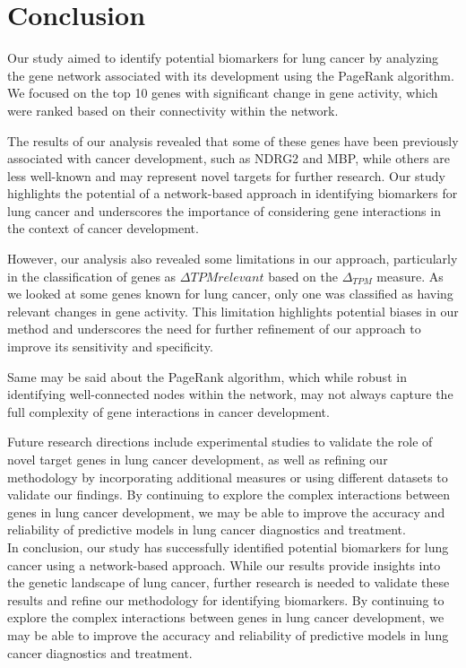 \section{Conclusion} \label{sec:conclusion}
Our study aimed to identify potential biomarkers for lung cancer by analyzing the gene network associated with its development
using the PageRank algorithm.
We focused on the top 10 genes with significant change in gene activity,
which were ranked based on their connectivity within the network.

The results of our analysis revealed that some of these genes have been previously associated with cancer development,
such as NDRG2 and MBP, while others are less well-known and may represent novel targets for further research.
Our study highlights the potential of a network-based approach in identifying biomarkers for lung cancer and
underscores the importance of considering gene interactions in the context of cancer development.


However, our analysis also revealed some limitations in our approach,
particularly in the classification of genes as $\Delta TPM relevant$ based on the $\Delta_{TPM}$ measure.
As we looked at some genes known for lung cancer, only one was classified as having relevant changes in gene activity.
This limitation highlights potential biases in our method and
underscores the need for further refinement of our approach to improve its sensitivity and specificity.


Same may be said about the PageRank algorithm, which while robust in identifying well-connected nodes within the network,
may not always capture the full complexity of gene interactions in cancer development.


Future research directions include experimental studies to validate the role of novel target genes in lung cancer development,
as well as refining our methodology by incorporating additional measures or
using different datasets to validate our findings.
By continuing to explore the complex interactions between genes in lung cancer development,
we may be able to improve the accuracy and reliability of predictive models in lung cancer diagnostics and treatment.\\

In conclusion, our study has successfully identified potential biomarkers for lung cancer using a network-based approach.
While our results provide insights into the genetic landscape of lung cancer,
further research is needed to validate these results and refine our methodology for identifying biomarkers.
By continuing to explore the complex interactions between genes in lung cancer development,
we may be able to improve the accuracy and reliability of predictive models in lung cancer diagnostics and treatment.